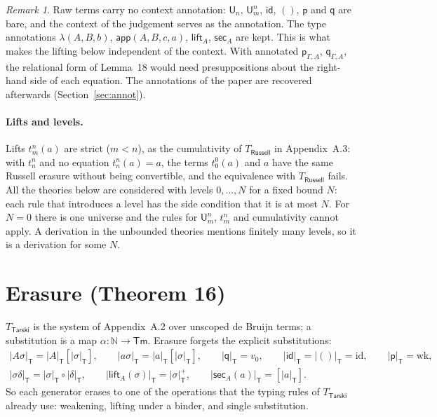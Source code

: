 \documentclass[11pt]{article}
\theoremstyle{definition}
\theoremstyle{remark}
\newtheorem*{remark}{Remark}
\newcommand{\U}{\mathsf U}
\newcommand{\p}{\mathsf p}
\newcommand{\q}{\mathsf q}
\newcommand{\id}{\mathsf{id}}
\newcommand{\lift}{\mathsf{lift}}
\newcommand{\sect}{\mathsf{sec}}
\newcommand{\app}{\mathsf{app}}
\newcommand{\er}[1]{|#1|_{\mathsf T}}
\begin{document}
\begin{remark}
Raw terms carry no context annotation: $\U_n$, $\U^n_m$, $\id$, $()$, $\p$
and $\q$ are bare, and the context of the judgement serves as the annotation.
The type annotations $\lambda(A,B,b)$, $\app(A,B,c,a)$, $\lift_A$, $\sect_A$
are kept. This is what makes the lifting below independent of the context.
With annotated $\p_{\Gamma,A}$, $\q_{\Gamma,A}$, the relational form of
Lemma~18 would need presuppositions about the right-hand side of each
equation. The annotations of the paper are recovered afterwards
(Section~\ref{sec:annot}).
\end{remark}

\paragraph{Lifts and levels.} Lifts $t^n_m(a)$ are strict ($m<n$), as the
cumulativity of $T_{\mathsf{Russell}}$ in Appendix~A.3: with $t^n_n$ and no
equation $t^n_n(a)=a$, the terms $t^0_0(a)$ and $a$ have the same Russell
erasure without being convertible, and the equivalence with
$T_{\mathsf{Russell}}$ fails. All the theories below are considered with
levels $0,\ldots,N$ for a fixed bound $N$: each rule that introduces a
level has the side condition that it is at most $N$. For $N=0$ there is one
universe and the rules for $\U^n_m$, $t^n_m$ and cumulativity cannot
apply. A derivation in the unbounded theories mentions finitely many
levels, so it is a derivation for some $N$.

\section{Erasure (Theorem 16)}

$T_{\mathsf{Tarski}}$ is the system of Appendix~A.2 over unscoped de Bruijn
terms; a substitution is a map $\alpha:\mathbb N\to\mathsf{Tm}$. Erasure
forgets the explicit substitutions:
\begin{gather*}
\er{A\sigma}=\er A[\er\sigma],\qquad \er{a\sigma}=\er a[\er\sigma],\qquad \er\q=v_0,\qquad
\er\id=\er{()}=\mathrm{id},\qquad \er\p=\mathrm{wk},\\
\er{\sigma\delta}=\er\sigma\circ\er\delta,\qquad
\er{\lift_A(\sigma)}=\er\sigma^+,\qquad \er{\sect_A(a)}=[\er a].
\end{gather*}
So each generator erases to one of the operations that the typing rules
of $T_{\mathsf{Tarski}}$ already use: weakening, lifting under a binder,
and single substitution.
\end{document}
